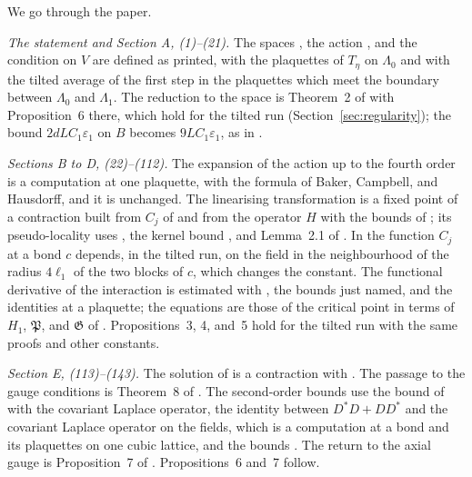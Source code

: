 \documentclass[11pt]{preprint}
\numberwithin{equation}{section}
\theoremstyle{definition}
\theoremstyle{remark}
\theoremstyle{plain}
\begin{document}
We go through the paper.

\emph{The statement and Section A, (1)--(21).} The spaces \cite[(2), (3), (6)]{BalabanVAR}, the action \cite[(5)]{BalabanVAR}, and the condition \cite[(7)]{BalabanVAR} on $V$ are defined as printed, with the plaquettes of $T_\eta$ on $\Lambda_0$ and with the tilted average of the first step in the plaquettes which meet the boundary between $\Lambda_0$ and $\Lambda_1$. The reduction to the space \cite[(19)--(21)]{BalabanVAR} is Theorem~2 of \cite{BalabanREG} with Proposition~6 there, which hold for the tilted run (Section~\ref{sec:regularity}); the bound $2dLC_1\varepsilon_1$ on $B$ becomes $9LC_1\varepsilon_1$, as in \cite[(1.37)]{BalabanREG}.

\emph{Sections B to D, (22)--(112).} The expansion \cite[(22)--(40)]{BalabanVAR} of the action up to the fourth order is a computation at one plaquette, with the formula of Baker, Campbell, and Hausdorff, and it is unchanged. The linearising transformation \cite[(44)--(62)]{BalabanVAR} is a fixed point of a contraction built from $C_j$ of \cite[Proposition~4]{BalabanAVG} and from the operator $H$ with the bounds \cite[(46)]{BalabanVAR} of \cite[Theorem~3.12]{BalabanPBG}; its pseudo-locality \cite[(63)--(73)]{BalabanVAR} uses \cite[Proposition~5, (157)]{BalabanAVG}, the kernel bound \cite[(3.133)]{BalabanPBG}, and Lemma~2.1 of \cite{BalabanPRT2}. In \cite[(69)]{BalabanVAR} the function $C_j$ at a bond $c$ depends, in the tilted run, on the field in the neighbourhood of the radius $4\ell_1$ of the two blocks of $c$, which changes the constant. The functional derivative of the interaction \cite[(74)--(98)]{BalabanVAR} is estimated with \cite[(3.132)]{BalabanPBG}, the bounds just named, and the identities \cite[(1.50), (1.52)]{BalabanREG} at a plaquette; the equations \cite[(99)--(112)]{BalabanVAR} are those of the critical point in terms of $H_1$, $\mathfrak P$, and $\mathfrak G$ of \cite[Section~D]{BalabanPBG}. Propositions~3, 4, and~5 hold for the tilted run with the same proofs and other constants.

\emph{Section E, (113)--(143).} The solution of \cite[(111)]{BalabanVAR} is a contraction with \cite[Theorem~3.13]{BalabanPBG}. The passage to the gauge conditions \cite[(123)]{BalabanVAR} is Theorem~8 of \cite{BalabanREG}. The second-order bounds \cite[(130)--(140)]{BalabanVAR} use the bound of \cite[(3.42)]{BalabanPBG} with the covariant Laplace operator, the identity \cite[(135)]{BalabanVAR} between $D^*D + DD^*$ and the covariant Laplace operator on the fields, which is a computation at a bond and its plaquettes on one cubic lattice, and the bounds \cite[(3.49), (3.69), (3.137)]{BalabanPBG}. The return to the axial gauge is Proposition~7 of \cite{BalabanREG}. Propositions~6 and~7 follow.
\end{document}
